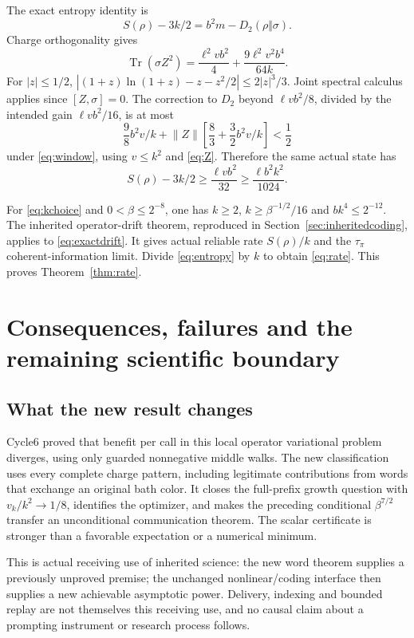 \documentclass[11pt]{article}
\newcommand{\Tr}{\operatorname{Tr}}
\newcommand{\norm}[1]{\lVert #1\rVert}
\begin{document}
The exact entropy identity is
\[
 S(\rho)-3k/2=b^2m-D_2(\rho\Vert\sigma).
\]
Charge orthogonality gives
\[
 \Tr(\sigma Z^2)=\frac{\ell^2vb^2}4
                   +\frac{9\ell^2v^2b^4}{64k}.
\]
For $|z|\le1/2$,
$|(1+z)\ln(1+z)-z-z^2/2|\le2|z|^3/3$.
Joint spectral calculus applies since $[Z,\sigma]=0$.
The correction to $D_2$ beyond $\ell vb^2/8$, divided by the intended
gain $\ell vb^2/16$, is at most
\begin{equation}\label{eq:entropyrem}
 \frac98 b^2v/k+\norm Z\left[\frac83+\frac32b^2v/k\right]<\frac12
\end{equation}
under \eqref{eq:window}, using $v\le k^2$ and \eqref{eq:Z}.
Therefore the same actual state has
\begin{equation}\label{eq:entropy}
 S(\rho)-3k/2\ge\frac{\ell vb^2}{32}
                   \ge\frac{\ell b^2k^2}{1024}.
\end{equation}

For \eqref{eq:kchoice} and $0<\beta\le2^{-8}$, one has $k\ge2$,
$k\ge\beta^{-1/2}/16$ and $bk^4\le2^{-12}$.
The inherited operator-drift theorem, reproduced in
Section~\ref{sec:inheritedcoding}, applies to \eqref{eq:exactdrift}.
It gives actual reliable rate $S(\rho)/k$ and the $\tau_\pi$
coherent-information limit. Divide \eqref{eq:entropy} by $k$ to obtain
\eqref{eq:rate}. This proves Theorem~\ref{thm:rate}.

\section{Consequences, failures and the remaining scientific boundary}

\subsection{What the new result changes}

Cycle6 proved that benefit per call in this local operator variational
problem diverges, using only guarded nonnegative middle walks. The new
classification uses every complete charge pattern, including legitimate
contributions from words that exchange an original bath color. It closes
the full-prefix growth question with $v_k/k^2\to1/8$, identifies the
optimizer, and makes the preceding conditional $\beta^{7/2}$ transfer
an unconditional communication theorem. The scalar certificate is stronger
than a favorable expectation or a numerical minimum.

This is actual receiving use of inherited science: the new word theorem
supplies a previously unproved premise; the unchanged nonlinear/coding
interface then supplies a new achievable asymptotic power. Delivery,
indexing and bounded replay are not themselves this receiving use, and
no causal claim about a prompting instrument or research process follows.
\end{document}
